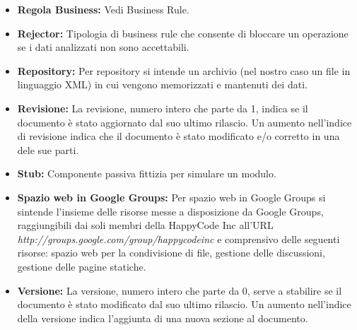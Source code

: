 \documentclass[11pt,titlepage,a4paper]{report}
\begin{document}
\begin{itemize}
\item{\textbf{Regola Business:}
Vedi Business Rule.}

\item{\textbf{Rejector:}
Tipologia di business rule che consente di bloccare un operazione se i dati analizzati non sono accettabili.}
 
\item{\textbf{Repository:}
Per repository si intende un archivio (nel nostro caso un file in linguaggio XML) in cui vengono memorizzati e mantenuti dei dati.}

\item{\textbf{Revisione:}
La revisione, numero intero che parte da 1,  indica se il documento \`e stato aggiornato dal suo ultimo rilascio. Un aumento nell'indice di revisione indica che il documento \`e stato modificato e/o corretto in una dele sue parti}.

\item{\textbf{Stub:}
Componente passiva fittizia per simulare un modulo.}

\item{\textbf{Spazio web in Google Groups:}
Per spazio web in Google Groups si sintende l'insieme delle risorse messe a disposizione da Google Groups, raggiungibili dai soli membri della HappyCode Inc all'URL\\ \textit{http://groups.google.com/group/happycodeinc} e comprensivo delle seguenti risorse: spazio web per la condivisione di file, gestione delle discussioni, gestione delle pagine statiche.}

\item{\textbf{Versione:}
La versione, numero intero che parte da 0, serve a stabilire se il documento \`e stato modificato dal suo ultimo rilascio. Un aumento nell'indice della versione indica l'aggiunta di  una nuova sezione al documento.}

\end{itemize}
\newpage
\tableofcontents
\end{document}
